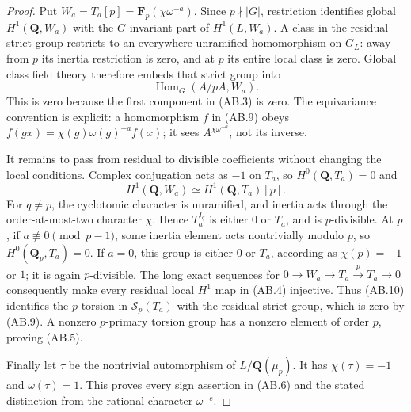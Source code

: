 \documentclass[11pt,a4paper]{article}
\theoremstyle{definition}
\begin{document}
\begin{proof}
Put $W_a=T_a[p]=\mathbf F_p(\chi\omega^{-a})$.
Since $p\nmid|G|$, restriction identifies global
$H^1(\mathbf Q,W_a)$ with the $G$-invariant part of
$H^1(L,W_a)$.  A class in the residual strict group
restricts to an everywhere unramified homomorphism on
$G_L$: away from $p$ its inertia restriction is zero,
and at $p$ its entire local class is zero.  Global class
field theory therefore embeds that strict group into
\[
                 \operatorname{Hom}_G(A/pA,W_a).          \tag{AB.9}
\]
This is zero because the first component in (AB.3) is zero.
The equivariance convention is explicit: a homomorphism
$f$ in (AB.9) obeys $f(gx)=\chi(g)\omega(g)^{-a}f(x)$;
it sees $A^{\chi\omega^{-a}}$, not its inverse.

It remains to pass from residual to divisible coefficients
without changing the local conditions.  Complex conjugation
acts as $-1$ on $T_a$, so $H^0(\mathbf Q,T_a)=0$ and
\[
              H^1(\mathbf Q,W_a)\simeq
                       H^1(\mathbf Q,T_a)[p].            \tag{AB.10}
\]
For $q\ne p$, the cyclotomic character is unramified, and
inertia acts through the order-at-most-two character $\chi$.
Hence $T_a^{I_q}$ is either $0$ or $T_a$, and is
$p$-divisible.  At $p$, if $a\not\equiv0\pmod{p-1}$,
some inertia element acts nontrivially modulo $p$, so
$H^0(\mathbf Q_p,T_a)=0$.  If $a=0$, this group is
either $0$ or $T_a$, according as $\chi(p)=-1$ or $1$;
it is again $p$-divisible.  The long exact sequences for
$0\to W_a\to T_a\xrightarrow{p}T_a\to0$ consequently
make every residual local $H^1$ map in (AB.4) injective.
Thus (AB.10) identifies the $p$-torsion in
$\mathcal S_p(T_a)$ with the residual strict group,
which is zero by (AB.9).  A nonzero $p$-primary torsion
group has a nonzero element of order $p$, proving (AB.5).

Finally let $\tau$ be the nontrivial automorphism of
$L/\mathbf Q(\mu_p)$.  It has $\chi(\tau)=-1$ and
$\omega(\tau)=1$.  This proves every sign assertion
in (AB.6) and the stated distinction from the rational
character $\omega^{-e}$.
\end{proof}
\end{document}
